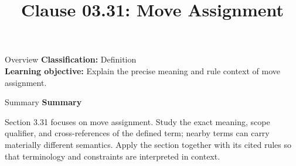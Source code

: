 \documentclass[10pt,letterpaper]{article}
\title{Clause 03.31: Move Assignment}
\author{}
\date{}
\begin{document}
\maketitle
\begin{CornellOverviewBox}{Overview}
\textbf{Classification:} Definition\\[2pt]
\textbf{Learning objective:} Explain the precise meaning and rule context of move assignment.
\end{CornellOverviewBox}\begin{CornellSummaryBox}{Summary}
{\sffamily\bfseries\color{Accent} Summary}\par\vspace{3pt}Section 3.31 focuses on move assignment. Study the exact meaning, scope qualifier, and cross-references of the defined term; nearby terms can carry materially different semantics. Apply the section together with its cited rules so that terminology and constraints are interpreted in context.
\end{CornellSummaryBox}
\end{document}
